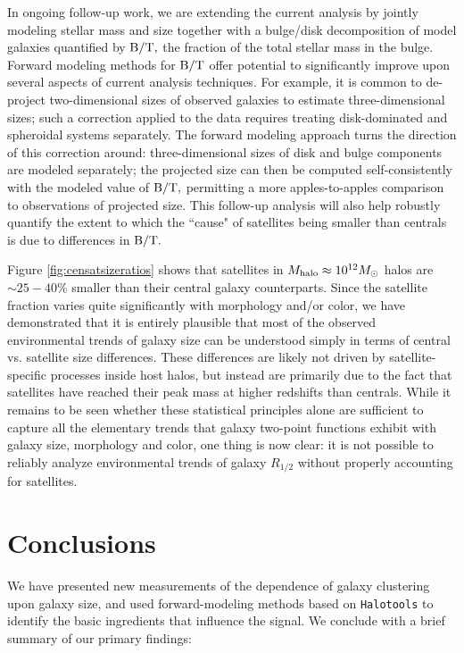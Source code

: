 \documentclass[usenatbib,usegraphicx,letterpaper]{mn2e}
\newcommand{\rhalf}{R_{1/2}}
\newcommand{\mhalo}{M_{\rm halo}}
\newcommand{\msun}{M_\odot}
\begin{document}
In ongoing follow-up work, we are extending the current analysis by jointly modeling stellar mass and size together with a bulge/disk decomposition of model galaxies quantified by ${\rm B/T},$ the fraction of the total stellar mass in the bulge. Forward modeling methods for ${\rm B/T}$ offer potential to significantly improve upon several aspects of current analysis techniques. For example, it is common to de-project two-dimensional sizes of observed galaxies to estimate three-dimensional sizes; such a correction applied to the data requires treating disk-dominated and spheroidal systems separately. The forward modeling approach turns the direction of this correction around: three-dimensional sizes of disk and bulge components are modeled separately; the projected size can then be computed self-consistently with the modeled value of ${\rm B/T},$ permitting a more apples-to-apples comparison to observations of projected size. This follow-up analysis will also help robustly quantify the extent to which the ``cause" of satellites being smaller than centrals is due to differences in ${\rm B/T}.$ 

Figure \ref{fig:censatsizeratios} shows that satellites in $\mhalo\approx10^{12}\msun$ halos are $\sim25-40\%$ smaller than their central galaxy counterparts. Since the satellite fraction varies quite significantly with morphology and/or color, we have demonstrated that it is entirely plausible that most of the observed environmental trends of galaxy size can be understood simply in terms of central vs. satellite size differences. These differences are likely not driven by satellite-specific processes inside host halos, but instead are primarily due to the fact that satellites have reached their peak mass at higher redshifts than centrals. While it remains to be seen whether these statistical principles alone are sufficient to capture all the elementary trends that galaxy two-point functions exhibit with galaxy size, morphology and color, one thing is now clear: it is not possible to reliably analyze environmental trends of galaxy $\rhalf$ without properly accounting for satellites.



\section{Conclusions}
\label{sec:conclusion}

We have presented new measurements of the dependence of galaxy clustering upon galaxy size, and used forward-modeling methods based on {\tt Halotools} to identify the basic ingredients that influence the signal. We conclude with a brief summary of our primary findings:
\end{document}
